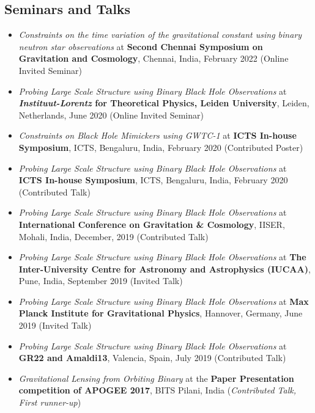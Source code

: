 \documentclass[margin, centered]{res}
\begin{document}
\begin{resume}
\section{Seminars and Talks}
\begin{itemize}[leftmargin=*]
	 \item \textit{Constraints on the time variation of the gravitational constant using binary neutron star observations} at \textbf{Second Chennai Symposium on Gravitation and Cosmology}, Chennai, India, February 2022 (Online Invited Seminar)
	 \item \textit{Probing Large Scale Structure using Binary Black Hole Observations} at \textbf{\textit{Instituut-Lorentz} for Theoretical Physics, Leiden University}, Leiden, Netherlands, June 2020 (Online Invited Seminar)
	 \item \textit{Constraints on Black Hole Mimickers using GWTC-1} at \textbf{ICTS In-house Symposium}, ICTS, Bengaluru, India, February 2020 (Contributed Poster)
	 \item \textit{Probing Large Scale Structure using Binary Black Hole Observations} at \textbf{ICTS In-house Symposium}, ICTS, Bengaluru, India, February 2020 (Contributed Talk)
	 \item \textit{Probing Large Scale Structure using Binary Black Hole Observations} at \textbf{International Conference on Gravitation \& Cosmology}, IISER, Mohali, India, December, 2019 (Contributed Talk)
	 \item \textit{Probing Large Scale Structure using Binary Black Hole Observations} at \textbf{The Inter-University Centre for Astronomy and Astrophysics (IUCAA)}, Pune, India, September 2019 (Invited Talk)
	 \item \textit{Probing Large Scale Structure using Binary Black Hole Observations} at \textbf{Max Planck Institute for Gravitational Physics}, Hannover, Germany, June 2019 (Invited Talk)
	\item \textit{Probing Large Scale Structure using Binary Black Hole Observations} at \textbf{GR22 and Amaldi13}, Valencia, Spain, July 2019 (Contributed Talk)
	\item \textit{Gravitational Lensing from Orbiting Binary} at the \textbf{Paper Presentation competition of APOGEE 2017}, BITS Pilani, India (\textit{Contributed Talk, First runner-up})

\end{itemize}


\end{resume}
\end{document}
